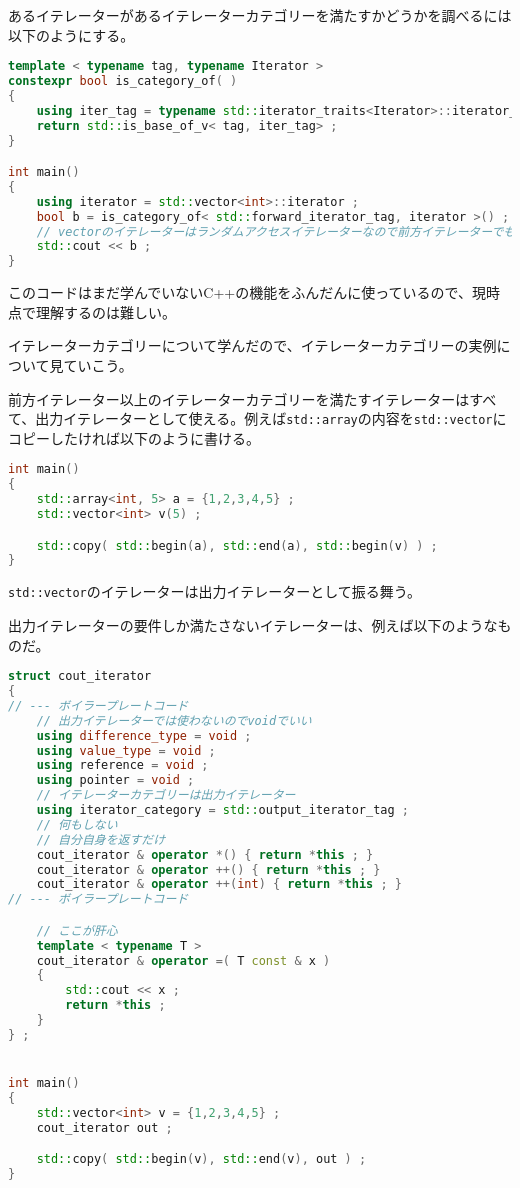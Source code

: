 あるイテレーターがあるイテレーターカテゴリーを満たすかどうかを調べるには以下のようにする。

\begin{lstlisting}[language={C++}]
template < typename tag, typename Iterator >
constexpr bool is_category_of( )
{
    using iter_tag = typename std::iterator_traits<Iterator>::iterator_category ;
    return std::is_base_of_v< tag, iter_tag> ;
}

int main()
{
    using iterator = std::vector<int>::iterator ;
    bool b = is_category_of< std::forward_iterator_tag, iterator >() ;
    // vectorのイテレーターはランダムアクセスイテレーターなので前方イテレーターでもある
    std::cout << b ;
}
\end{lstlisting}

このコードはまだ学んでいないC++の機能をふんだんに使っているので、現時点で理解するのは難しい。

\clearpage
{}

イテレーターカテゴリーについて学んだので、イテレーターカテゴリーの実例について見ていこう。


前方イテレーター以上のイテレーターカテゴリーを満たすイテレーターはすべて、出力イテレーターとして使える。例えば\texttt{std::array}の内容を\texttt{std::vector}にコピーしたければ以下のように書ける。

\begin{lstlisting}[language={C++}]
int main()
{
    std::array<int, 5> a = {1,2,3,4,5} ;
    std::vector<int> v(5) ;

    std::copy( std::begin(a), std::end(a), std::begin(v) ) ;
}
\end{lstlisting}

\texttt{std::vector}のイテレーターは出力イテレーターとして振る舞う。

出力イテレーターの要件しか満たさないイテレーターは、例えば以下のようなものだ。

\begin{lstlisting}[language={C++}]
struct cout_iterator
{
// --- ボイラープレートコード
    // 出力イテレーターでは使わないのでvoidでいい
    using difference_type = void ;
    using value_type = void ;
    using reference = void ;
    using pointer = void ;
    // イテレーターカテゴリーは出力イテレーター
    using iterator_category = std::output_iterator_tag ;
    // 何もしない
    // 自分自身を返すだけ
    cout_iterator & operator *() { return *this ; }
    cout_iterator & operator ++() { return *this ; }
    cout_iterator & operator ++(int) { return *this ; }
// --- ボイラープレートコード

    // ここが肝心
    template < typename T >
    cout_iterator & operator =( T const & x )
    {
        std::cout << x ;
        return *this ;
    }
} ;


int main()
{
    std::vector<int> v = {1,2,3,4,5} ;
    cout_iterator out ;

    std::copy( std::begin(v), std::end(v), out ) ;
}
\end{lstlisting}

